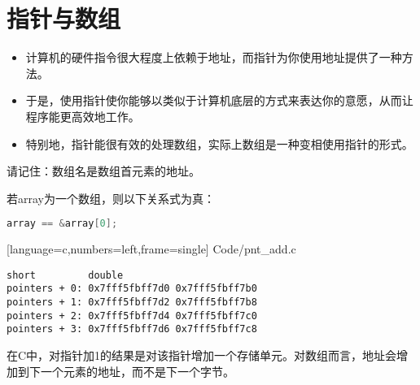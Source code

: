 \section{指针与数组}

\begin{frame}[fragile]\ft{\secname}
\begin{itemize}
\item
计算机的硬件指令很大程度上依赖于地址，而指针为你使用地址提供了一种方法。\\[0.1in]
\item
于是，使用指针使你能够以类似于计算机底层的方式来表达你的意愿，从而让程序能更高效地工作。\\[0.1in]
\item 
特别地，指针能很有效的处理数组，实际上数组是一种变相使用指针的形式。
\end{itemize}
\end{frame}


\begin{frame}[fragile]\ft{\secname}
请记住：\textcolor{acolor1}{数组名是数组首元素的地址。}
\pause \vspace{0.2in}

若{\tf array}为一个数组，则以下关系式为真：
\begin{lstlisting}[language=c,backgroundcolor=\color{red!20}]
array == &array[0];
\end{lstlisting}
\end{frame}


\begin{frame}\ft{\secname}
  
  [language=c,numbers=left,frame=single]
  {Code/pnt_add.c}
\end{frame}


\begin{frame}[fragile]\ft{\secname}

\begin{lstlisting}[backgroundcolor=\color{red!20}]
                  short         double
pointers + 0: 0x7fff5fbff7d0 0x7fff5fbff7b0
pointers + 1: 0x7fff5fbff7d2 0x7fff5fbff7b8
pointers + 2: 0x7fff5fbff7d4 0x7fff5fbff7c0
pointers + 3: 0x7fff5fbff7d6 0x7fff5fbff7c8
\end{lstlisting}
\end{frame}


\begin{frame}[fragile]\ft{\secname}
在C中，对指针加1的结果是对该指针增加一个存储单元。对数组而言，地址会增加到下一个元素的地址，而不是下一个字节。
\end{frame}


